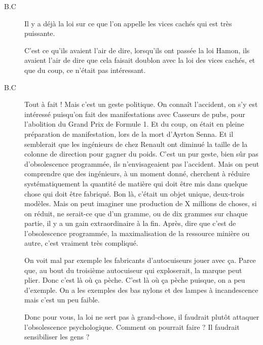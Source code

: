 \begin{description}
\vspace{1\baselineskip}

\item[B.C]Il y a déjà la loi sur ce que l'on appelle les vices cachés qui est très puissante.

\vspace{1\baselineskip}

C'est ce qu'ils avaient l'air de dire, lorsqu'ils ont passée la loi Hamon, ils avaient l'air de dire que cela faisait doublon avec la loi des vices cachés, et que du coup, ce n'était pas intéressant.

\vspace{1\baselineskip}

\item[B.C]Tout à fait ! Mais c'est un geste politique. On connaît l'accident, on s'y est intéressé puisqu'on fait des manifestations avec Casseurs de pubs, pour l'abolition du Grand Prix de Formule 1. Et du coup, on était en pleine préparation de manifestation, lors de la mort d'Ayrton Senna. Et il semblerait que les ingénieurs de chez Renault ont diminué la taille de la colonne de direction pour gagner du poids. C'est un pur geste, bien sûr pas d'obsolescence programmée, ils n'envisageaient pas l'accident. Mais on peut comprendre que des ingénieurs, à un moment donné, cherchent à réduire systématiquement la quantité de matière qui doit être mis dans quelque chose qui doit être fabriqué. Bon là, c'était un objet unique, deux-trois modèles. Mais on peut imaginer une production de X millions de choses, si on réduit, ne serait-ce que d'un gramme, ou de dix grammes sur chaque partie, il y a un gain extraordinaire à la fin. Après, dire que c'est de l'obsolescence programmée, la maximalisation de la ressource minière ou autre, c'est vraiment très compliqué.

On voit mal par exemple les fabricants d'autocuiseurs jouer avec ça. Parce que, au bout du troisième autocuiseur qui exploserait, la marque peut plier. Donc c'est là où ça pèche. C'est là où ça pèche puisque, on a peu d'exemple. On a les exemples des bas nylons et des lampes à incandescence mais c'est un peu faible.

\vspace{1\baselineskip}

Donc pour vous, la loi ne sert pas à grand-chose, il faudrait plutôt attaquer l'obsolescence  psychologique. 
Comment on pourrait faire ? Il faudrait sensibiliser les gens ?

\vspace{1\baselineskip}


\end{description}
